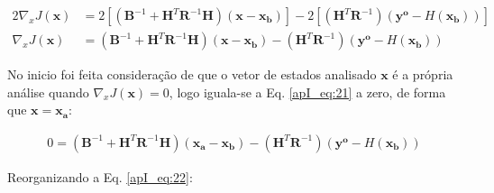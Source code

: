 

\begin{align}
  \label{apI_eq:20}
    2\nabla_{x}{J(\mathbf{x})} & = 2[(\mathbf{B}^{-1} + \mathbf{H}^{T}\mathbf{R}^{-1}\mathbf{H})(\mathbf{x} - \mathbf{x_{b}})] - 2[(\mathbf{H}^{T}\mathbf{R}^{-1})(\mathbf{y^{o}} - \textit{H}(\mathbf{x_{b}}))] \\
  \label{apI_eq:21}
    \nabla_{x}{J(\mathbf{x})} & = (\mathbf{B}^{-1} + \mathbf{H}^{T}\mathbf{R}^{-1}\mathbf{H})(\mathbf{x} - \mathbf{x_{b}}) - (\mathbf{H}^{T}\mathbf{R}^{-1})(\mathbf{y^{o}} - \textit{H}(\mathbf{x_{b}}))
\end{align}

No inicio foi feita consideração de que o vetor de estados analisado $\mathbf{x}$ é a própria análise quando $\nabla_{x}{J(\mathbf{x})} = 0$, logo iguala-se a Eq. \ref{apI_eq:21} a zero, de forma que $\mathbf{x} = \mathbf{x_{a}}$:

\begin{equation}
  \label{apI_eq:22}
  \begin{split}
    0 = (\mathbf{B}^{-1} + \mathbf{H}^{T}\mathbf{R}^{-1}\mathbf{H})(\mathbf{x_{a}} - \mathbf{x_{b}}) - (\mathbf{H}^{T}\mathbf{R}^{-1})(\mathbf{y^{o}} - \textit{H}(\mathbf{x_{b}}))
  \end{split}  
\end{equation}

Reorganizando a Eq. \ref{apI_eq:22}:



